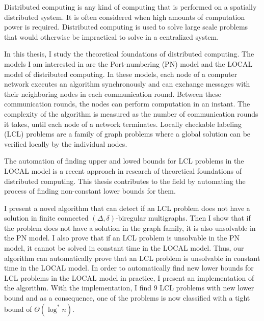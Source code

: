 \begin{abstractpage}[english]
%
%
Distributed computing is any kind of computing that is performed on a spatially distributed system.
It is often considered when high amounts of computation power is required.
Distributed computing is used to solve large scale problems that would otherwise be impractical to solve in a centralized system.

In this thesis, I study the theoretical foundations of distributed computing.
The models I am interested in are the Port-numbering (PN) model and the LOCAL model of distributed computing.
In these models, each node of a computer network executes an algorithm synchronously and can exchange messages with their neighboring nodes in each communication round.
Between these communication rounds, the nodes can perform computation in an instant.
The complexity of the algorithm is measured as the number of communication rounds it takes, until each node of a network terminates.
Locally checkable labeling (LCL) problems are a family of graph problems where a global solution can be verified locally by the individual nodes.

The automation of finding upper and lowed bounds for LCL problems in the LOCAL model is a recent approach in research of theoretical foundations of distributed computing.
This thesis contributes to the field by automating the process of finding non-constant lower bounds for them.

I present a novel algorithm that can detect if an LCL problem does not have a solution in finite connected $(\Delta, \delta)$-biregular multigraphs.
Then I show that if the problem does not have a solution in the graph family, it is also unsolvable in the PN model.
I also prove that if an LCL problem is unsolvable in the PN model, it cannot be solved in constant time in the LOCAL model.
Thus, our algorithm can automatically prove that an LCL problem is unsolvable in constant time in the LOCAL model.
In order to automatically find new lower bounds for LCL problems in the LOCAL model in practice, I present an implementation of the algorithm.
With the implementation, I find 9 LCL problems with new lower bound and as a consequence, one of the problems is now classified with a tight bound of $\Theta(\log^* n)$.



\end{abstractpage}

